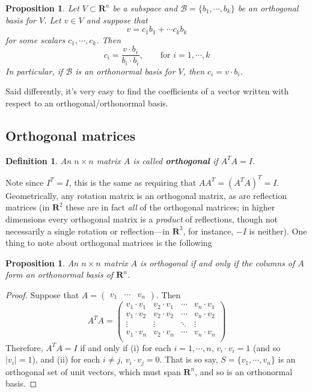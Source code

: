 \documentclass[12pt]{article}
\numberwithin{equation}{subsection}
\numberwithin{figure}{subsection}
\newtheorem{defn}[subsection]{Definition}
\newtheorem{prop}[subsection]{Proposition}
\theoremstyle{note}
\newcommand{\R}{\mathbf{R}}
\begin{document}
\begin{prop}
	Let $V\subset \R^n$ be a subspace and $\mathcal{B}=\{b_1,\cdots,b_k\}$ be an orthogonal basis for $V$. Let $v \in V$ and suppose that \[ v= c_1 b_1 + \cdots c_k b_k\] for some scalars $c_1,\cdots,c_k$. Then \begin{equation} 
		c_i = \dfrac{v\cdot b_i}{b_i \cdot b_i}, \qquad \text{for $i=1,\cdots,k$}
	\end{equation}
	In particular, if $\mathcal{B}$ is an orthonormal basis for $V$, then $c_i=v\cdot b_i$.
\end{prop}
Said differently, it's very easy to find the coefficients of a vector written with respect to an orthogonal/orthonormal basis. 

\subsection{Orthogonal matrices}

\begin{defn}
	An $n\times n$ matrix $A$ is called \textbf{orthogonal} if $A^TA=I$. 
\end{defn}

Note since $I^T=I$, this is the same as requiring that $AA^T=(A^TA)^T=I$. Geometrically, any rotation matrix is an orthogonal matrix, as are reflection matrices (in $\mathbf{R}^2$ these are in fact \textit{all} of the orthogonal matrices; in higher dimensions every orthogonal matrix is a \textit{product} of reflections, though not necessarily a single rotation or reflection---in $\mathbf{R}^3$, for instance, $-I$ is neither). One thing to note about orthogonal matrices is the following

\begin{prop} An $n\times n$ matrix $A$ is orthogonal if and only if the columns of $A$ form an orthonormal basis of $\R^n$. 
\end{prop}
\begin{proof}
	Suppose that $A=\begin{pmatrix} v_1 & \cdots & v_n\end{pmatrix}$. Then \[A^TA=\begin{pmatrix} 
	v_1 \cdot v_1 & v_2 \cdot v_1 & \cdots & v_n \cdot v_1 \\ 
	v_1 \cdot v_2 & v_2 \cdot v_2 & \cdots & v_n \cdot v_2 \\
	\vdots & \vdots & \ddots & \vdots \\
	v_1 \cdot v_n & v_2 \cdot v_n & \cdots & v_n \cdot v_n \\
	\end{pmatrix}\]
	Therefore, $A^TA=I$ if and only if (i) for each $i=1,\cdots,n$, $v_i\cdot v_i=1$ (and so $|v_i|=1$), and (ii) for each $i\neq j$, $v_i\cdot v_j=0$. That is so say, $S=\{v_1,\cdots,v_n\}$ is an orthogonal set of unit vectors, which must span $\R^n$, and so is an orthonormal basis.   
\end{proof}
\end{document}
